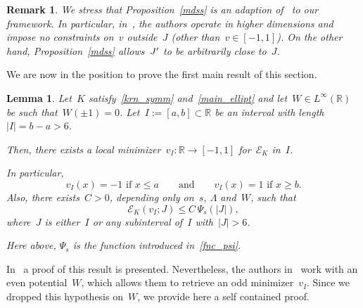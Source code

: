 \documentclass[10pt,a4paper]{amsart}
\newtheorem{lemma}[theorem]{Lemma}
\newtheorem{rem}[theorem]{Remark}
\numberwithin{equation}{section}
\newcommand{\R}{\mathbb{R}}
\newcommand{\Ec}{\mathcal{E}_K}
\renewcommand{\leqslant}{\leq}
\begin{document}
\begin{rem}
{\rm
We stress that Proposition~\ref{mdss} is an adaption of~\cite[Proposition~3.1]{CozziValdNONLINEARITY} to our framework. In particular, in~\cite{CozziValdNONLINEARITY}, the authors operate in higher dimensions and impose no constraints on~$v$ outside~$J$ (other than~$v \in [-1,1]$). On the other hand, Proposition~\ref{mdss} allows~$J\rq{}$ to be arbitrarily close to~$J$.
}
\end{rem}

We are now in the position to prove the first main result of this section.

\begin{lemma}\label{min_open_inter}
Let~$K$ satisfy~\eqref{krn_symm} and~\eqref{main_ellipt} and let~$W \in L^{\infty}(\R)$ be such that~$W(\pm1)=0$. Let~$I:=[a,b] \subset \R$ be an interval with length~$|I|= b-a>6$.   
	
Then, there exists a local minimizer~$v_{I}: \R \to [-1,1]$ for~$\Ec$ in~$I$. 

In particular,
\begin{equation}\label{vi_prop}
{v_{I}(x)=-1} \mbox{ if }{x\leq a}\qquad {\mbox{and}}\qquad
{v_{I}(x)=1}  \mbox{ if }{x\geq b}.
\end{equation}
Also, there exists~$C>0$, depending only on~$s$, $\Lambda$ and~$W$, such that
\begin{equation}\label{bound_energy}
    		\Ec(v_{I};J) \leqslant C \, \Psi_s(|J |),
\end{equation}
where~$J$ is either~$I$ or any subinterval of~$I$ with~$|J | >6$.

Here above, $\Psi_s$ is the function introduced in~\eqref{fnc_psi}.
\end{lemma}

In~\cite[Lemma~6.1]{CP16} a proof of this result is presented. Nevertheless, the authors in~\cite{CP16} work with an even potential~$W$, which allows them to retrieve an odd minimizer~$v_I$. Since we dropped this hypothesis on~$W$, we provide here a self contained proof.
\end{document}
